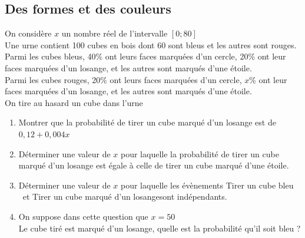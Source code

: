 \documentclass[oneside,12pt]{article}          %
\begin{document}
\subsection{Des formes et des couleurs}
On considère $x$ un nombre réel de l'intervalle $[0;80]$ \\
Une urne contient 100 cubes en bois dont 60 sont bleus et les autres sont rouges. \\
Parmi les cubes bleus, 40$\%$ ont leurs faces marquées d'un cercle, 20$\%$ ont leur faces marquées d'un losange, et les autres sont marqués d'une étoile. \\
Parmi les cubes rouges, 20$\%$ ont leurs faces marquées d'un cercle, $x\%$ ont leur faces marquées d'un losange, et les autres sont marqués d'une étoile.\\
On tire au hasard un cube dans l'urne
\begin{enumerate}
    \item Montrer que la probabilité de tirer un cube marqué d'un losange est de $0,12 + 0,004x$
    \item Déterminer une valeur de $x$ pour laquelle la probabilité de tirer un cube marqué d'un losange est égale à celle de tirer un cube marqué d'une étoile.
    \item Déterminer une valeur de $x$ pour laquelle les évènements \og Tirer un cube bleu \fg ~et \og Tirer un cube marqué d'un losange\fg sont indépendants.
    \item On suppose dans cette question que $x=50$ \\
    Le cube tiré est marqué d'un losange, quelle est la probabilité qu'il soit bleu ?
\end{enumerate}
\end{document}
